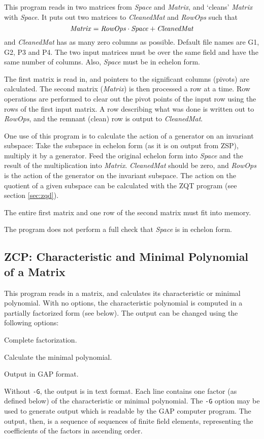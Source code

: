 \Description
This program reads in two matrices from {\it Space} and {\it Matrix},
and `cleans' {\it Matrix} with {\it Space}. It puts out two matrices
to {\it CleanedMat} and {\it RowOps} such that
\[
	{\it Matrix} = {\it RowOps}\cdot{\it Space}+{\it CleanedMat}
\]
and {\it CleanedMat} has as many zero columns as possible. Default
file names are G1, G2, P3 and P4.
The two input matrices must be over the same field and have the same
number of columns. Also, {\it Space} must be in echelon form.

The first matrix is read in, and pointers to the significant columns
(pivots) are calculated.
The second matrix ({\it Matrix}) is then processed a row at a time.
Row operations are performed to clear out the pivot points
of the input row using the rows of the first input matrix. A row
describing what was done is written out to {\it RowOps}, and the
remnant (clean) row is output to {\it CleanedMat}.

One use of this program is to calculate the action of a generator
on an invariant subspace: Take the subspace in echelon form (as it
is on output from ZSP), multiply it by a generator. Feed the original
echelon form into {\it Space} and the result of the multiplication into
{\it Matrix}. {\it CleanedMat} should be zero, and {\it RowOps} is the
action of the generator on the invariant subspace.
The action on the quotient of a given subspace can be calculated with
the ZQT program (see section \ref{sec:zqd}).

\Limits
The entire first matrix and one row of the second matrix must fit
into memory.

\Bugs
The program does not perform a full check that {\it Space}
is in echelon form.


\subsection{ZCP: Characteristic and Minimal Polynomial of a Matrix}
\Syntax
{}

\Description
This program reads in a matrix, and calculates its characteristic or
minimal polynomial. With no options, the characteristic polynomial is
computed in a partially factorized form (see below). The output can be
changed using the following options:
\begin{list}{}{ \leftmargin 10mm 
\parsep 0mm\itemsep 0mm}
\item[{\tt -f}]	Complete factorization.
\item[{\tt -m}]	Calculate the minimal polynomial.
\item[{\tt -G}]	Output in GAP format.
\end{list}
Without \verb"-G", the output is in text format. Each line contains one
factor (as defined below) of the characteristic or minimal polynomial.
The {\tt -G} option may be used to generate output which
is readable by the GAP computer program. The output, then, is a
sequence of sequences of finite field elements, representing the
coefficients of the factors in ascending order.

